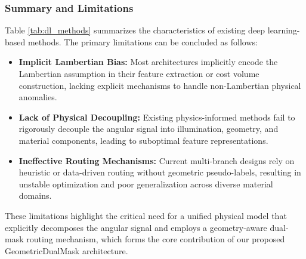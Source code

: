 \subsubsection{Summary and Limitations}
Table \ref{tab:dl_methods} summarizes the characteristics of existing deep learning-based methods. The primary limitations can be concluded as follows:
\begin{itemize}
\item \textbf{Implicit Lambertian Bias:} Most architectures implicitly encode the Lambertian assumption in their feature extraction or cost volume construction, lacking explicit mechanisms to handle non-Lambertian physical anomalies.
\item \textbf{Lack of Physical Decoupling:} Existing physics-informed methods fail to rigorously decouple the angular signal into illumination, geometry, and material components, leading to suboptimal feature representations.
\item \textbf{Ineffective Routing Mechanisms:} Current multi-branch designs rely on heuristic or data-driven routing without geometric pseudo-labels, resulting in unstable optimization and poor generalization across diverse material domains.
\end{itemize}

These limitations highlight the critical need for a unified physical model that explicitly decomposes the angular signal and employs a geometry-aware dual-mask routing mechanism, which forms the core contribution of our proposed GeometricDualMask architecture.

\begin{table}[!t]
\centering
\caption{Comparison of Deep Learning-based Light Field Depth Estimation Methods}
\label{tab:dl_methods}
\end{table}

